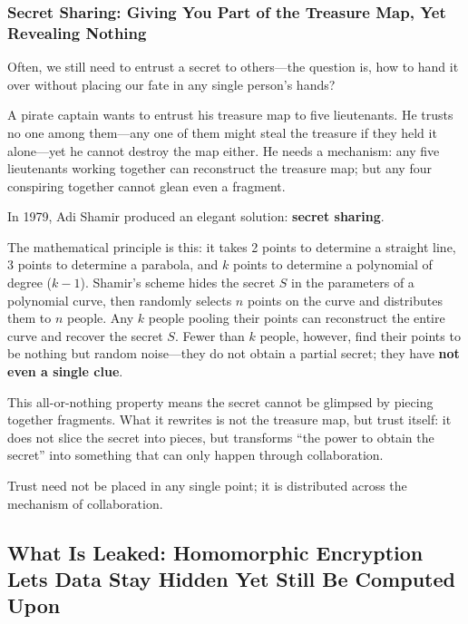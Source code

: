 {}
\subsubsection{Secret Sharing: Giving You Part of the Treasure Map, Yet Revealing Nothing}

Often, we still need to entrust a secret to others---the question is, how to hand it over without placing our fate in any single person's hands?

A pirate captain wants to entrust his treasure map to five lieutenants. He trusts no one among them---any one of them might steal the treasure if they held it alone---yet he cannot destroy the map either.
He needs a mechanism:
any five lieutenants working together can reconstruct the treasure map;
but any four conspiring together cannot glean even a fragment.

\vspace{1em}

In 1979, Adi Shamir produced an elegant solution: \textbf{secret sharing}.

The mathematical principle is this: it takes 2 points to determine a straight line, 3 points to determine a parabola, and $k$ points to determine a polynomial of degree ($k-1$).
Shamir's scheme hides the secret $S$ in the parameters of a polynomial curve, then randomly selects $n$ points on the curve and distributes them to $n$ people. Any $k$ people pooling their points can reconstruct the entire curve and recover the secret $S$. Fewer than $k$ people, however, find their points to be nothing but random noise---they do not obtain a partial secret; they have \textbf{not even a single clue}.

This all-or-nothing property means the secret cannot be glimpsed by piecing together fragments. What it rewrites is not the treasure map, but trust itself:
it does not slice the secret into pieces, but transforms ``the power to obtain the secret'' into something that can only happen through collaboration.

\begin{importantbox}
Trust need not be placed in any single point; it is distributed across the mechanism of collaboration.
\end{importantbox}



\newpage
\subsection{What Is Leaked: Homomorphic Encryption Lets Data Stay Hidden Yet Still Be Computed Upon}


